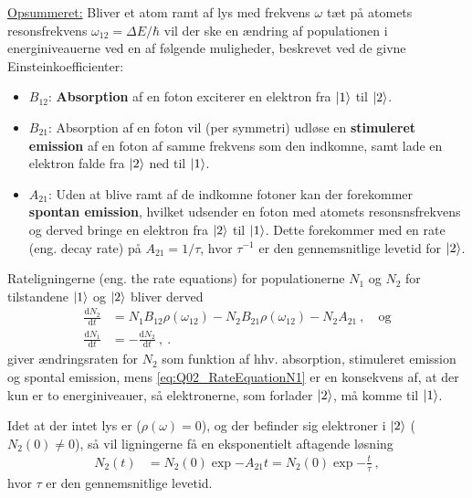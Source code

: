 \underline{Opsummeret:} Bliver et atom ramt af lys med frekvens $\omega$ tæt på atomets resonsfrekvens $\omega_{12} = \Delta E / \hbar$ vil der ske en ændring af populationen i energiniveauerne ved en af følgende muligheder, beskrevet ved de givne Einsteinkoefficienter:
\begin{itemize}
    \item $B_{12}$: \textbf{Absorption} af en foton exciterer en elektron fra $\ket{1}$ til $\ket{2}$.
    \item $B_{21}$: Absorption af en foton vil (per symmetri) udløse en \textbf{stimuleret emission} af en foton af samme frekvens som den indkomne, samt lade en elektron falde fra $\ket{2}$ ned til $\ket{1}$.
    \item $A_{21}$: Uden at blive ramt af de indkomne fotoner kan der forekommer \textbf{spontan emission}, hvilket udsender en foton med atomets resonsnsfrekvens og derved bringe en elektron fra $\ket{2}$ til $\ket{1}$. Dette forekommer med en rate (eng. decay rate) på $A_{21} = 1/\tau$, hvor $\tau^{-1}$ er den gennemsnitlige levetid for $\ket{2}$.
\end{itemize}

Rateligningerne (eng. the rate equations) for populationerne $N_1$ og $N_2$ for tilstandene $\ket{1}$ og $\ket{2}$ bliver derved
\begin{align}
    \frac{\text{d}N_2}{\text{d}t} &= N_1 B_{12} \rho(\omega_{12}) - N_2 B_{21} \rho(\omega_{12}) - N_2 A_{21} \: , \quad \text{og} \label{eq:Q02_RateEquationN2}\\
    \frac{\text{d}N_1}{\text{d}t} &= - \frac{\text{d}N_2}{\text{d}t} \: , \label{eq:Q02_RateEquationN1} \: .
\end{align}
 giver ændringsraten for $N_2$ som funktion af hhv. absorption, stimuleret emission og spontal emission, mens \cref{eq:Q02_RateEquationN1} er en konsekvens af, at der kun er to energiniveauer, så elektronerne, som forlader $\ket{2}$, må komme til $\ket{1}$.

Idet at der intet lys er ($\rho(\omega) = 0$), og der befinder sig elektroner i $\ket{2}$ ($N_2(0) \ne 0$), så vil ligningerne få en eksponentielt aftagende løsning
\begin{align}
    N_2(t) &= N_2(0)\exp{-A_{21}t} = N_2(0)\exp{-\frac{t}{\tau}} \: ,
\end{align}
hvor $\tau$ er den gennemsnitlige levetid.



